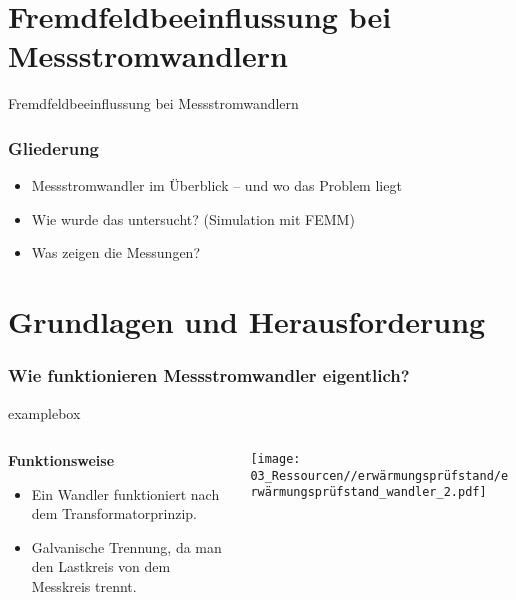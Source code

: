 \section{Fremdfeldbeeinflussung bei Messstromwandlern}

\begin{frame}
    \centering
    \vfill
    {\Huge Fremdfeldbeeinflussung bei Messstromwandlern}
    \vfill
\end{frame}


\begin{frame}
    \frametitle{Gliederung}
    \begin{itemize}
        \Large
        \item Messstromwandler im Überblick – und wo das Problem liegt
        \item Wie wurde das untersucht? (Simulation mit FEMM)
        \item Was zeigen die Messungen?
    \end{itemize}
\end{frame}



\section*{Grundlagen und Herausforderung}

\begin{frame}
    \frametitle{Wie funktionieren Messstromwandler eigentlich?}
    \begin{beamercolorbox}[wd=\textwidth, sep=1ex, rounded=true, shadow=true]{examplebox}
        \begin{columns}[T]
            \begin{column}{0.3\textwidth}
                \textbf{Funktionsweise}
                \begin{itemize}
                    \item Ein Wandler funktioniert nach dem Transformatorprinzip.
                    \item Galvanische Trennung, da man den Lastkreis von dem Messkreis trennt.
                \end{itemize}
            \end{column}

            \begin{column}{0.55\textwidth}
                \texttt{[image: 03\_Ressourcen//erwärmungsprüfstand/erwärmungsprüfstand\_wandler\_2.pdf]}
            \end{column}
        \end{columns}
    \end{beamercolorbox}

\end{frame}


